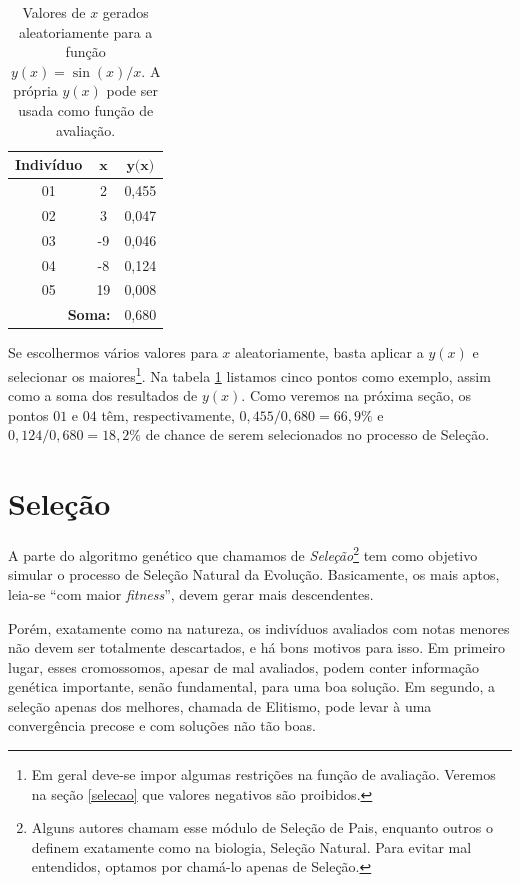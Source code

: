 	
	\begin{table}[htp]		
		\caption{\label{tabSen}Valores de $x$ gerados aleatoriamente para a função $y(x) = \sin(x)/x$. A própria $y(x)$ pode ser usada como função de avaliação.}
		\begin{center}
			\begin{tabular}{c|c|c}
				\hline
				\textbf{Indivíduo}& $\textbf{x}$		& $\textbf{y(x)}$ \\
				\hline
				01 & 	2							& 0,455 \\
				02 & 	3							& 0,047 \\
				03 &	-9						& 0,046\\	
				04 &	-8							& 0,124 \\
				05 &	19							& 	0,008 \\
				\hline
				\multicolumn{2}{r}{\textbf{Soma:}} & 0,680 \\
				\hline
			\end{tabular}
		\end{center}
	\end{table}
	
	
	Se escolhermos vários valores para $x$ aleatoriamente, basta aplicar a $y(x)$ e selecionar os maiores\footnote{Em geral deve-se impor algumas restrições na função de avaliação. Veremos na seção \ref{selecao} que valores negativos são proibidos.}. Na tabela \ref{tabSen} listamos cinco pontos como exemplo, assim como a soma dos resultados de $y(x)$. Como veremos na próxima seção, os pontos $01$ e $04$ têm, respectivamente, $0,455/0,680 = 66,9\%$ e $ 0,124/0,680 = 18,2\%$ de chance de serem selecionados no processo de Seleção.
	
	\section{\label{selecao}Seleção}
	
	A parte do algoritmo genético que chamamos de \textit{Seleção}\footnote{Alguns autores chamam esse módulo de Seleção de Pais, enquanto outros o definem exatamente como na biologia, Seleção Natural. Para evitar mal entendidos, optamos por chamá-lo apenas de Seleção.} tem como objetivo simular o processo de Seleção Natural da Evolução. Basicamente, os  mais aptos, leia-se ``com maior \textit{fitness}'', devem gerar mais descendentes.
	
	Porém, exatamente como na natureza, os indivíduos avaliados com notas menores não devem ser totalmente descartados, e há bons motivos para isso. Em primeiro lugar, esses cromossomos, apesar de mal avaliados, podem conter informação genética importante, senão fundamental, para uma boa solução. Em segundo, a seleção apenas dos melhores, chamada de Elitismo, pode levar à uma convergência precose e com soluções não tão boas.
	
